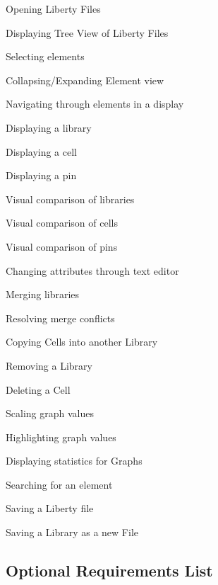 \documentclass[10pt,a4paper]{report}
\begin{document}
\begin{FR}
    \item Opening Liberty Files \label{FR-1}
    \item Displaying Tree View of Liberty Files \label{FR-2}
    \item Selecting elements \label{FR-3} %
    \item Collapsing/Expanding Element view \label{FR-4.5} %
    \item Navigating through elements in a display \label{FR-(-i)/67}
    \item Displaying a library \label{FR-4.420/9}
    \item Displaying a cell \label{FR-47}
    \item Displaying a pin \label{FR-576476}
    \item Visual comparison of libraries \label{FR-69}
    \item Visual comparison of cells \label{FR-543}
    \item Visual comparison of pins \label{FR-567}
    \item Changing attributes through text editor \label{FR-11}
    \item Merging libraries \label{FR-6}
    \item Resolving merge conflicts \label{FR-7}
    \item Copying Cells into another Library\label{FR-8}
    \item Removing a Library \label{FR-9}
    \item Deleting a Cell \label{FR-10}
    \item Scaling graph values \label{FR-12}
    \item Highlighting graph values \label{FR-13}
    \item Displaying statistics for Graphs \label{FR-14}
    \item Searching for an element \label{FR-15}
    \item Saving a Liberty file \label{FR-16}
    \item Saving a Library as a new File \label{FR-17}
\end{FR}
\subsection{Optional Requirements List}
\end{document}
